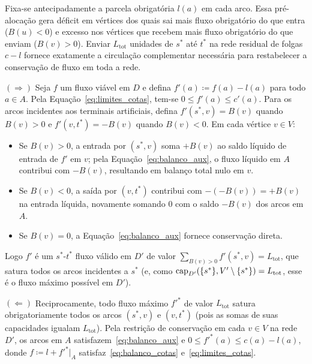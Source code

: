  Fixa-se antecipadamente a parcela obrigatória $l(a)$ em cada arco. Essa pré-alocação gera déficit em vértices dos quais sai mais fluxo obrigatório do que entra ($B(u) < 0$) e excesso nos vértices que recebem mais fluxo obrigatório do que enviam ($B(v) > 0$). Enviar $L_{\text{tot}}$ unidades de $s^*$ até $t^*$ na rede residual de folgas $c - l$ fornece exatamente a circulação complementar necessária para restabelecer a conservação de fluxo em toda a rede.

\begin{demonstracao}
$(\Rightarrow)$ Seja $f$ um fluxo viável em $D$ e defina $f'(a) \coloneqq f(a) - l(a)$ para todo $a \in A$. Pela Equação~\eqref{eq:limites_cotas}, tem-se $0 \le f'(a) \le c'(a)$. Para os arcos incidentes aos terminais artificiais, defina $f'(s^*, v) = B(v)$ quando $B(v) > 0$ e $f'(v, t^*) = -B(v)$ quando $B(v) < 0$. Em cada vértice $v \in V$:
\begin{itemize}
    \item Se $B(v) > 0$, a entrada por $(s^*, v)$ soma $+B(v)$ ao saldo líquido de entrada de $f'$ em $v$; pela Equação~\eqref{eq:balanco_aux}, o fluxo líquido em $A$ contribui com $-B(v)$, resultando em balanço total nulo em $v$.
    \item Se $B(v) < 0$, a saída por $(v, t^*)$ contribui com $-(-B(v)) = +B(v)$ na entrada líquida, novamente somando $0$ com o saldo $-B(v)$ dos arcos em $A$.
    \item Se $B(v) = 0$, a Equação~\eqref{eq:balanco_aux} fornece conservação direta.
\end{itemize}
Logo $f'$ é um $s^*$-$t^*$ fluxo válido em $D'$ de valor $\sum_{B(v) > 0} f'(s^*, v) = L_{\text{tot}}$, que satura todos os arcos incidentes a $s^*$ (e, como $\operatorname{cap}_{D'}(\{s^*\}, V' \setminus \{s^*\}) = L_{\text{tot}}$, esse é o fluxo máximo possível em $D'$).

$(\Leftarrow)$ Reciprocamente, todo fluxo máximo $f'^*$ de valor $L_{\text{tot}}$ satura obrigatoriamente todos os arcos $(s^*, v)$ e $(v, t^*)$ (pois as somas de suas capacidades igualam $L_{\text{tot}}$). Pela restrição de conservação em cada $v \in V$ na rede $D'$, os arcos em $A$ satisfazem~\eqref{eq:balanco_aux} e $0 \le f'^*(a) \le c(a) - l(a)$, donde $f \coloneqq l + f'^*|_A$ satisfaz~\eqref{eq:balanco_cotas} e~\eqref{eq:limites_cotas}.


\end{demonstracao}
